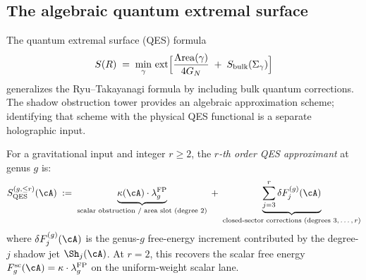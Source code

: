 %
%

\subsection{The algebraic quantum extremal surface}
\label{subsec:thqg-entanglement-qes}

The quantum extremal surface (QES) formula
\cite{Engelhardt-Wall14}
\begin{equation}\label{eq:thqg-qes-physical}
S(R) \;=\; \min_{\gamma}\,\operatorname{ext}\Bigl[
\frac{\mathrm{Area}(\gamma)}{4G_N}
\;+\; S_{\mathrm{bulk}}(\Sigma_\gamma)
\Bigr]
\end{equation}
generalizes the Ryu--Takayanagi formula \cite{Ryu-Takayanagi06}
by including bulk quantum corrections.  The shadow obstruction tower
provides an algebraic approximation scheme; identifying that scheme
with the physical QES functional is a separate holographic input.

\begin{definition}
\label{def:thqg-qes-approximant}
For a gravitational input and integer $r \ge 2$, the
\emph{$r$-th order QES approximant} at genus $g$ is:
\begin{equation}\label{eq:thqg-qes-approximant}
S_{\mathrm{QES}}^{(g, \le r)}(\cA)
\;:=\;
\underbrace{
\kappa(\cA) \cdot \lambda_g^{\mathrm{FP}}
}_{\text{scalar obstruction / area slot (degree $2$)}}
\;+\;
\underbrace{
\sum_{j=3}^{r} \delta F^{(g)}_j(\cA)
}_{\text{closed-sector corrections (degrees $3, \ldots, r$)}}
\end{equation}
where $\delta F^{(g)}_j(\cA)$ is the genus-$g$ free-energy
increment contributed by the degree-$j$ shadow jet
$\Sh_j(\cA)$. At $r = 2$, this recovers the scalar
free energy $F_g^{\mathrm{sc}}(\cA) = \kappa \cdot \lambda_g^{\mathrm{FP}}$
on the uniform-weight scalar lane.
\end{definition}

